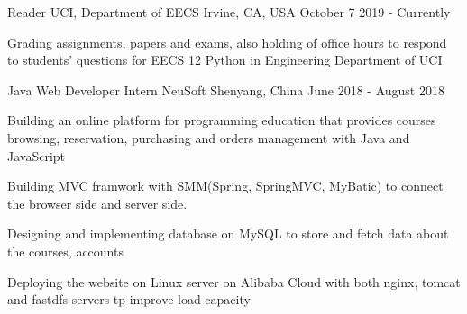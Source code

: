 
\begin{cventries}
  \cventry
    {Reader} %
    {UCI, Department of EECS} %
    {Irvine, CA, USA} %
    {October 7 2019 - Currently} %
    {
      \begin{cvitems} %
        \item {Grading assignments, papers and exams, also holding of office hours to respond to students' questions for EECS 12 Python in Engineering Department of UCI.}
      \end{cvitems}
    }

  \cventry
    {Java Web Developer Intern} %
    {NeuSoft} %
    {Shenyang, China} %
    {June 2018 - August 2018} %
    {
      \begin{cvitems} %
        \item {Building an online platform for programming education that provides courses browsing, reservation, purchasing and orders management with Java and JavaScript}
        \item {Building MVC framwork with SMM(Spring, SpringMVC, MyBatic) to connect the browser side and server side. }
        \item {Designing and implementing database on MySQL to store and fetch data about the courses, accounts}
        \item {Deploying the website on Linux server on Alibaba Cloud with both nginx, tomcat and fastdfs servers tp improve load capacity}
      \end{cvitems}
    }

\end{cventries}
